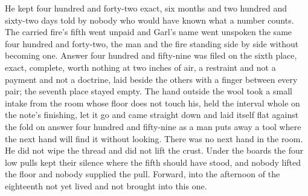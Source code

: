 He kept four hundred and forty-two exact, six months and two hundred and sixty-two days told by nobody who would have known what a number counts. The carried fire's fifth went unpaid and Garl's name went unspoken the same four hundred and forty-two, the man and the fire standing side by side without becoming one. Answer four hundred and fifty-nine was filed on the sixth place, exact, complete, worth nothing at two inches of air, a restraint and not a payment and not a doctrine, laid beside the others with a finger between every pair; the seventh place stayed empty. The hand outside the wool took a small intake from the room whose floor does not touch his, held the interval whole on the note's finishing, let it go and came straight down and laid itself flat against the fold on answer four hundred and fifty-nine as a man puts away a tool where the next hand will find it without looking. There was no next hand in the room. He did not wipe the thread and did not lift the crust. Under the boards the four low pulls kept their silence where the fifth should have stood, and nobody lifted the floor and nobody supplied the pull. Forward, into the afternoon of the eighteenth not yet lived and not brought into this one.
